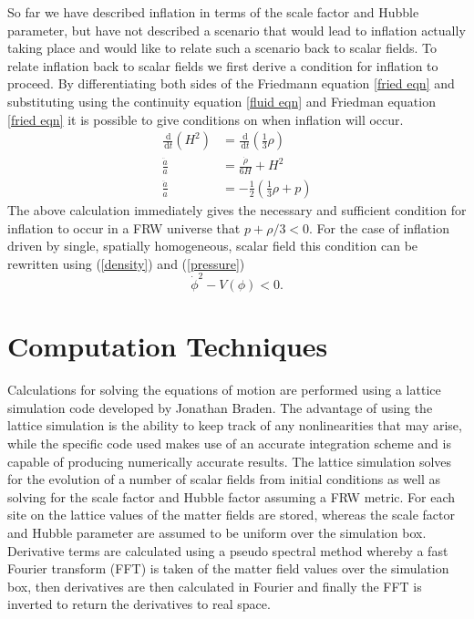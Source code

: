 \documentclass[letterpaper,11pt]{article}
\newcommand{\ud}{\,\mathrm{d}}
\begin{document}
So far we have described inflation in terms of the scale factor and Hubble parameter, but have not described a scenario that would lead to inflation actually taking place and would like to relate such a scenario back to scalar fields. To relate inflation back to scalar fields we first derive a condition for inflation to proceed. By differentiating both sides of the Friedmann equation \ref{fried eqn} and substituting using the continuity equation \ref{fluid eqn} and Friedman equation \ref{fried eqn} it is possible to give conditions on when inflation will occur.%
\begin{align}
\frac{\ud}{\ud t}(H^2)&=\frac{\ud}{\ud t}(\frac{1}{3}\rho)\\
\frac{\ddot{a}}{a}&=\frac{\dot{\rho}}{6H}+H^2\\
\frac{\ddot{a}}{a}&=-\frac{1}{2}(\frac{1}{3}\rho+p)
\end{align}
The above calculation immediately gives the necessary and sufficient condition for inflation to occur in a FRW universe that $p+\rho/3<0$. For the case of inflation driven by single, spatially homogeneous, scalar field this condition can be rewritten using (\ref{density}) and (\ref{pressure})
\begin{equation}
\dot{\phi}^2-V(\phi)<0. \label{inflation condition 3a}
\end{equation}


\section{Computation Techniques}
Calculations for solving the equations of motion are performed using a lattice simulation code developed by Jonathan Braden.%
The advantage of using the lattice simulation is the ability to keep track of any nonlinearities that may arise, while the specific code used makes use of an accurate integration scheme and is capable of producing numerically accurate results. %
The lattice simulation solves for the evolution of a number of scalar fields from initial conditions as well as solving for the scale factor and Hubble factor assuming a FRW metric. For each site on the lattice values of the matter fields are stored, whereas the scale factor and Hubble parameter are assumed to be uniform over the simulation box. Derivative terms are calculated using a pseudo spectral method whereby a fast Fourier transform (FFT) is taken of the matter field values over the simulation box, then derivatives are then calculated in Fourier and finally the FFT is inverted to return the derivatives to real space.
\end{document}
